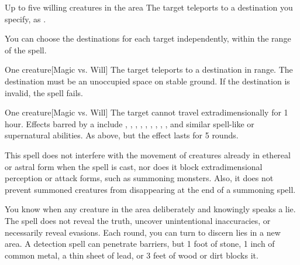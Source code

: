 \begin{spelltarget}{Up to five willing creatures in the area}
    \spelleffect The target teleports to a destination you specify, as .
\end{spelltarget}
\spellnotes You can choose the destinations for each target independently, within the range of the spell. 

\spellrng{\rngmed}
\begin{spelltarget}{One creature}[Magic vs. Will]
    \spelleffect The target teleports to a destination in range. The destination must be an unoccupied space on stable ground. If the destination is invalid, the spell fails.
\end{spelltarget}

\spellrng{\rngmed}
\begin{spelltarget}{One creature}[Magic vs. Will]
    \spellsuccess  The target cannot travel extradimensionally for 1 hour. Effects barred by a  include , , , , , , , , , and similar spell-like or supernatural abilities.
    \spellfailure As above, but the effect lasts for 5 rounds.
\end{spelltarget}
\spellnotes This spell does not interfere with the movement of creatures already in ethereal or astral form when the spell is cast, nor does it block extradimensional perception or attack forms, such as summoning monsters. Also, it does not prevent summoned creatures from disappearing at the end of a summoning spell.

\spellline
\spelleffect You know when any creature in the area deliberately and knowingly speaks a lie. The spell does not reveal the truth, uncover unintentional inaccuracies, or necessarily reveal evasions.
\spellnotes Each round, you can turn to discern lies in a new area. A detection spell can penetrate barriers, but 1 foot of stone, 1 inch of common metal, a thin sheet of lead, or 3 feet of wood or dirt blocks it.

